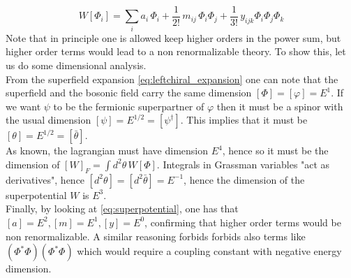 \documentclass[12pt]{article}
\begin{document}
\begin{equation*}
  W[\Phi_i] = \sum_i a_i \, \Phi_i + \frac{1}{2!} \, m_{ij} \, \Phi_i\Phi_j + \frac{1}{3!} \, y_{ijk} \Phi_i \Phi_j \Phi_k
\end{equation*}
Note that in principle one is allowed keep higher orders in the power sum, but higher order terms would lead to a non renormalizable theory. To show this, let us do some dimensional analysis. \\
From the superfield expansion \ref{eq:leftchiral_expansion} one can note that the superfield and the bosonic field carry the same dimension $[\Phi] = [\varphi] = E^1$. If we want $\psi$ to be the fermionic 
superpartner of $\varphi$ then it must be a spinor with the usual dimension $[\psi] = E^{1/2} = [\psi^\dagger]$. This implies that it must be $[\theta] = E^{1/2} = [\bar\theta]$. \\ 
As known, the lagrangian must have dimension $E^4$, hence so  
it must be the dimension of $[W]_F = \int d^2\theta \, W[\Phi]$. Integrals in Grassman variables "act as derivatives", hence $[d^2\theta] = [d^2\bar\theta] = E^{-1}$, hence the dimension of the superpotential $W$ is $E^3$. \\
Finally, by looking at \ref{eq:superpotential}, one has that $[a] = E^2, [m] = E^1, [y] = E^0$, confirming that higher order terms would be non renormalizable. A similar reasoning forbids forbids also terms like $(\Phi^*\Phi)(\Phi^*\Phi)$ which would require a coupling constant with negative energy dimension.

\vspace{15pt}
\end{document}
